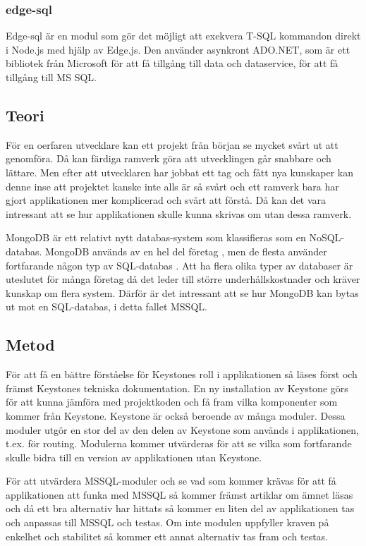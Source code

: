 \subsubsection{edge-sql}
Edge-sql är en modul som gör det möjligt att exekvera T-SQL kommandon direkt i Node.js med hjälp av Edge.js. Den använder asynkront ADO.NET, som är ett bibliotek från Microsoft för att få tillgång till data och dataservice, för att få tillgång till MS SQL. 

\subsection{Teori}
För en oerfaren utvecklare kan ett projekt från början se mycket svårt ut att genomföra. Då kan färdiga ramverk göra att utvecklingen går snabbare och lättare. Men efter att utvecklaren har jobbat ett tag och fått nya kunskaper kan denne inse att projektet kanske inte alls är så svårt och ett ramverk bara har gjort applikationen mer komplicerad och svårt att förstå. Då kan det vara intressant att se hur applikationen skulle kunna skrivas om utan dessa ramverk. 

MongoDB är ett relativt nytt databas-system som klassifieras som en NoSQL-databas. MongoDB används av en hel del företag \cite{mongoComp}, men de flesta använder fortfarande någon typ av SQL-databas \cite{databaseStats}. Att ha flera olika typer av databaser är uteslutet för många företag då det leder till större underhållskostnader och kräver kunskap om flera system. Därför är det intressant att se hur MongoDB kan bytas ut mot en SQL-databas, i detta fallet MSSQL.


\subsection{Metod}
För att få en bättre förståelse för Keystones roll i applikationen så läses först och främst Keystones tekniska dokumentation. En ny installation av Keystone görs för att kunna jämföra med projektkoden och få fram vilka komponenter som kommer från Keystone. Keystone är också beroende av många moduler. Dessa moduler utgör en stor del av den delen av Keystone som används i applikationen, t.ex. för routing. Modulerna kommer utvärderas för att se vilka som fortfarande skulle bidra till en version av applikationen utan Keystone. 

För att utvärdera MSSQL-moduler och se vad som kommer krävas för att få applikationen att funka med MSSQL så kommer främst artiklar om ämnet läsas och då ett bra alternativ har hittats så kommer en liten del av applikationen tas och anpassas till MSSQL och testas. Om inte modulen uppfyller kraven på enkelhet och stabilitet så kommer ett annat alternativ tas fram och testas.

